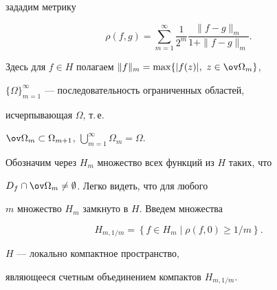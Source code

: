 зададим метрику


$$


\rho(f,g)=\sum\limits_{m=1}^{\infty}\frac{1}{2^m}\frac{\|f-g\|_m}


{1+\|f-g\|_m}.


$$


Здесь для $f\in H$ полагаем $\|f\|_m=\max\{|f(z)|,\ z\in\ov\Omega_m\}$, 


$\{\Omega\}_{m=1}^{\infty}$ --- последовательность ограниченных областей, 


исчерпывающая $\Omega$, т.\,е.


$\ov\Omega_m\subset \Omega_{m+1}$, $\bigcup\limits_{m=1}^{\infty}


\Omega_m=\Omega$.


Обозначим через $H_m$ множество всех функций из $H$ таких, что 


$D_f\cap\ov\Omega_m\not=\emptyset$. Легко видеть, что для любого


$m$ множество $H_m$ замкнуто в $H$. Введем множества 


$$


H_{m,1/m}=\left\{f\in H_m\mid \rho(f,0)\ge 1/m\right\}.


$$





\begin{lem}\label{lemma2}


$H$ --- локально компактное пространство, 


являющееся счетным объединением компактов $H_{m,1/m}$. 


\end{lem}





